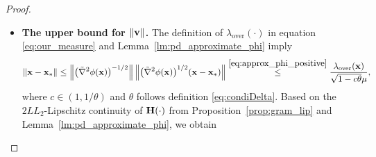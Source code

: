 \documentclass[11pt]{article}
\theoremstyle{plain}
\theoremstyle{definition}
\theoremstyle{remark}
\theoremstyle{plain}
\newcommand{\Norm}[1]{\left\| #1 \right\|}
\def\A{{\bf A}}
\def\B{{\bf B}}
\def\G{{\bf G}}
\def\H{{\bf H}}
\def\I{{\bf I}}
\def\u{{\bf u}}
\def\v{{\bf v}}
\def\x{{\bf x}}
\begin{document}
\begin{proof}
\begin{itemize}
\begin{align*}
(1-c\theta)\bigl(\tilde{\nabla}^2\phi(\x)\bigr)^{-1}
\preceq (\H(\x))^{-1}
\preceq (1+c\theta)\bigl(\tilde{\nabla}^2\phi(\x)\bigr)^{-1},
\end{align*}
where $c\in(1,1/\theta)$ and $\theta$ follows definition \eqref{eq:condiDelta}.
The above results yields
\begin{align}
\label{eq:boundGinverse}
\frac{1-c\theta}{\eta}\bigl(\tilde{\nabla}^2\phi(\x)\bigr)^{-1}
\preceq \frac{1}{\eta}(\H(\x))^{-1}\preceq\G^{-1}\preceq (\H(\x))^{-1}
\preceq(1+c\theta)\bigl(\tilde{\nabla}^2\phi(\x)\bigr)^{-1}.
\end{align}
Applying Lemma~\ref{lm:matrix_order_equivalence}
to equation \eqref{eq:boundGinverse} 
with $\A=(\tilde{\nabla}^2\phi(\x))^{-1}$, 
$\B=\G^{-1}$, $a_1=(1-c\theta)/\eta$, and $a_2=1+c\theta$
gives
\begin{align}
\label{eq:upperphiGphi}
\frac{1-c\theta}{\eta}\I_d
\preceq\bigl(\tilde{\nabla}^2\phi(\x)\bigr)^{1/2}\G^{-1}
\bigl(\tilde{\nabla}^2\phi(\x)\bigr)^{1/2}
\preceq(1+c\theta)\I_d.
\end{align}
Recall that the setting $\eta\geq 1$ implies $c\theta\leq1-(1-c\theta)/\eta$, which leads to
\begin{align}\label{eq:bound_u}
\begin{split}
\|\u\|
& \overset{\eqref{dfn:proof-u},\,\eqref{eq:our_measure}}\leq\Bigl\|\I_d-\big(\tilde{\nabla}^2\phi(\x)\big)^{1/2}\G^{-1}
\big(\tilde{\nabla}^2\phi(\x)\big)^{1/2}\Bigr\|
\lambda_{\mathrm{over}}(\x) \\
&~~\,\overset{\eqref{eq:upperphiGphi}}{\leq}~~\,
\left(1-\frac{1-c\theta}{\eta}\right)\lambda_{\mathrm{over}}(\x).
\end{split}
\end{align}
\item \textbf{The upper bound for $\|\v\|$.}
The definition of $\lambda_{\mathrm{over}}(\cdot)$ in equation
\eqref{eq:our_measure} and Lemma~\ref{lm:pd_approximate_phi}
imply
\begin{align}
\label{eq:distance_lambda}
\|\x-\x_*\|
\leq\Norm{\bigl(\tilde{\nabla}^2\phi(\x)\bigr)^{-1/2}}
\Norm{\bigl(\tilde{\nabla}^2\phi(\x)\bigr)^{1/2}(\x-\x_*)}
\overset{\eqref{eq:approx_phi_positive}}{\leq}
\frac{\lambda_{\mathrm{over}}(\x)}{\sqrt{1-c\theta}\mu},
\end{align}
where $c\in(1,1/\theta)$ and $\theta$ follows definition \eqref{eq:condiDelta}.
Based on the $2LL_2$-Lipschitz continuity of $\H(\cdot)$ from
Proposition~\ref{prop:gram_lip} and Lemma~\ref{lm:pd_approximate_phi}, we obtain

\end{itemize}
\end{proof}
\end{document}
